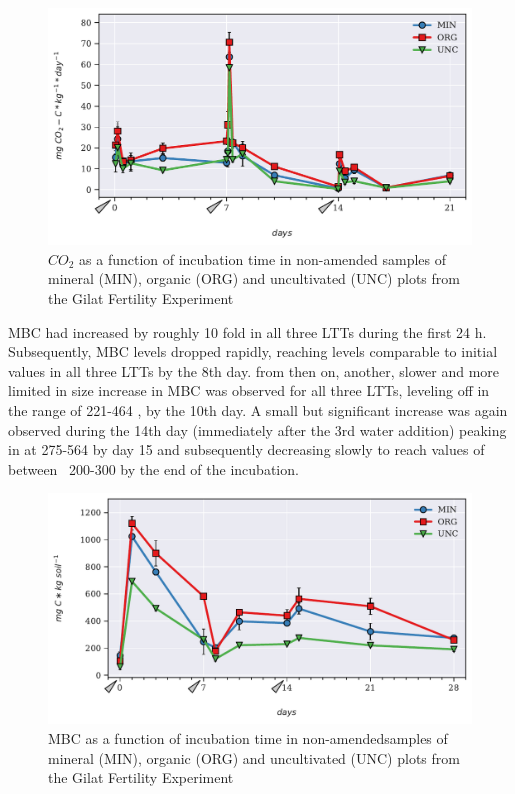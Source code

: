 			\begin{figure}[H]
				\centering
				\includegraphics[scale=0.8, width=\linewidth]{thesis_figures/main_incubation/control/Resp.pdf}
				\caption{$CO_2$  as a function of incubation time in non-amended samples of mineral (MIN), organic (ORG) and uncultivated (UNC) plots from the Gilat Fertility Experiment}
				\label{fig:resp_control_main}
			\end{figure}
			\noindent MBC had increased by roughly 10 fold in all three LTTs during the first 24 h. Subsequently, MBC levels dropped rapidly, reaching levels comparable to initial values in all three LTTs by the 8th day. from then on, another, slower and more limited in size increase in MBC was observed for all three LTTs, leveling off in the range of 221-464 \genericunit, by the 10th day. A small but significant increase was again observed during the 14th day (immediately after the 3rd water addition) peaking in at 275-564 \genericunit by day 15 and subsequently decreasing slowly to reach values of between ~200-300 \genericunit by the end of the incubation.\\
			\begin{figure}[H]
				\centering
				\includegraphics[scale=0.8, width=\linewidth]{thesis_figures/main_incubation/control/MBC.pdf}
				\caption{MBC  as a function of incubation time in non-amendedsamples of mineral (MIN), organic (ORG) and uncultivated (UNC) plots from the Gilat Fertility Experiment}
				\label{fig:mbc_control_main}
			\end{figure}
